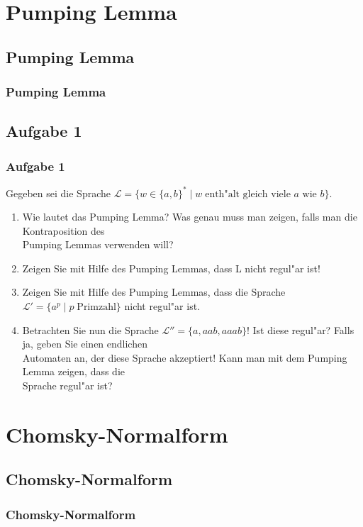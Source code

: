 


\section{Pumping Lemma}
\subsection{Pumping Lemma}
\begin{frame}
	\frametitle{Pumping Lemma}
\end{frame}

\subsection{Aufgabe 1}
\begin{frame}
	\frametitle{Aufgabe 1}
	Gegeben sei die Sprache $\mathcal{L} = \{w \in \{a,b\}^* \; | \; w \;
	\mbox{enth"alt gleich viele $a$ wie $b$}\}$.
	\begin{enumerate}
		\item Wie lautet das Pumping Lemma? Was genau muss man zeigen, falls man die
		Kontraposition des\\
		Pumping Lemmas verwenden will?
		\item Zeigen Sie mit Hilfe des Pumping Lemmas, dass L nicht regul"ar ist!
		\item Zeigen Sie mit Hilfe des Pumping Lemmas, dass die Sprache $\mathcal{L}' =
		\{a^p\; | \; p \; \mbox{Primzahl}\}$ nicht regul"ar ist.
		\item Betrachten Sie nun die Sprache $\mathcal{L}'' = \{a,aab,aaab\}$! Ist diese
		regul"ar? Falls ja, geben Sie einen endlichen\\
		Automaten an, der diese Sprache akzeptiert! Kann man mit dem Pumping Lemma zeigen,
		dass die\\
		Sprache regul"ar ist?
	\end{enumerate}
\end{frame}

\section{Chomsky-Normalform}
\subsection{Chomsky-Normalform}
\begin{frame}
	\frametitle{Chomsky-Normalform}
\end{frame}

